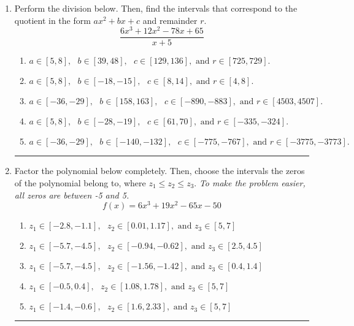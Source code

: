 \documentclass[14pt]{extbook}
\newcommand{\litem}[1]{\item#1\hspace*{-1cm}\rule{\textwidth}{0.4pt}}
\begin{document}
\begin{enumerate}
\litem{
Perform the division below. Then, find the intervals that correspond to the quotient in the form $ax^2+bx+c$ and remainder $r$.\[ \frac{6x^{3} +12 x^{2} -78 x + 65}{x + 5} \]\begin{enumerate}[label=\Alph*.]
\item \( a \in [5, 8], \text{   } b \in [39, 48], \text{   } c \in [129, 136], \text{   and   } r \in [725, 729]. \)
\item \( a \in [5, 8], \text{   } b \in [-18, -15], \text{   } c \in [8, 14], \text{   and   } r \in [4, 8]. \)
\item \( a \in [-36, -29], \text{   } b \in [158, 163], \text{   } c \in [-890, -883], \text{   and   } r \in [4503, 4507]. \)
\item \( a \in [5, 8], \text{   } b \in [-28, -19], \text{   } c \in [61, 70], \text{   and   } r \in [-335, -324]. \)
\item \( a \in [-36, -29], \text{   } b \in [-140, -132], \text{   } c \in [-775, -767], \text{   and   } r \in [-3775, -3773]. \)

\end{enumerate} }
\litem{
Factor the polynomial below completely. Then, choose the intervals the zeros of the polynomial belong to, where $z_1 \leq z_2 \leq z_3$. \textit{To make the problem easier, all zeros are between -5 and 5.}\[ f(x) = 6x^{3} +19 x^{2} -65 x -50 \]\begin{enumerate}[label=\Alph*.]
\item \( z_1 \in [-2.8, -1.1], \text{   }  z_2 \in [0.01, 1.17], \text{   and   } z_3 \in [5, 7] \)
\item \( z_1 \in [-5.7, -4.5], \text{   }  z_2 \in [-0.94, -0.62], \text{   and   } z_3 \in [2.5, 4.5] \)
\item \( z_1 \in [-5.7, -4.5], \text{   }  z_2 \in [-1.56, -1.42], \text{   and   } z_3 \in [0.4, 1.4] \)
\item \( z_1 \in [-0.5, 0.4], \text{   }  z_2 \in [1.08, 1.78], \text{   and   } z_3 \in [5, 7] \)
\item \( z_1 \in [-1.4, -0.6], \text{   }  z_2 \in [1.6, 2.33], \text{   and   } z_3 \in [5, 7] \)


\end{enumerate}}
\end{enumerate}
\end{document}
